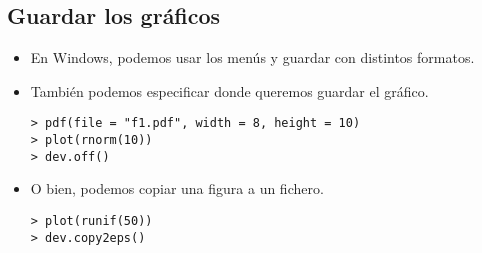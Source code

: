\newslide

\subsection{Guardar los gráficos}

\begin{itemize}
\item En Windows, podemos usar los menús y guardar con distintos
formatos.

\item También podemos especificar donde queremos guardar el
gráfico.
\begin{verbatim}
> pdf(file = "f1.pdf", width = 8, height = 10)
> plot(rnorm(10))
> dev.off()
\end{verbatim}

\item O bien, podemos copiar una figura a un fichero.
\begin{verbatim}
> plot(runif(50))
> dev.copy2eps()
\end{verbatim}

\end{itemize}

\newslide



\endinput
